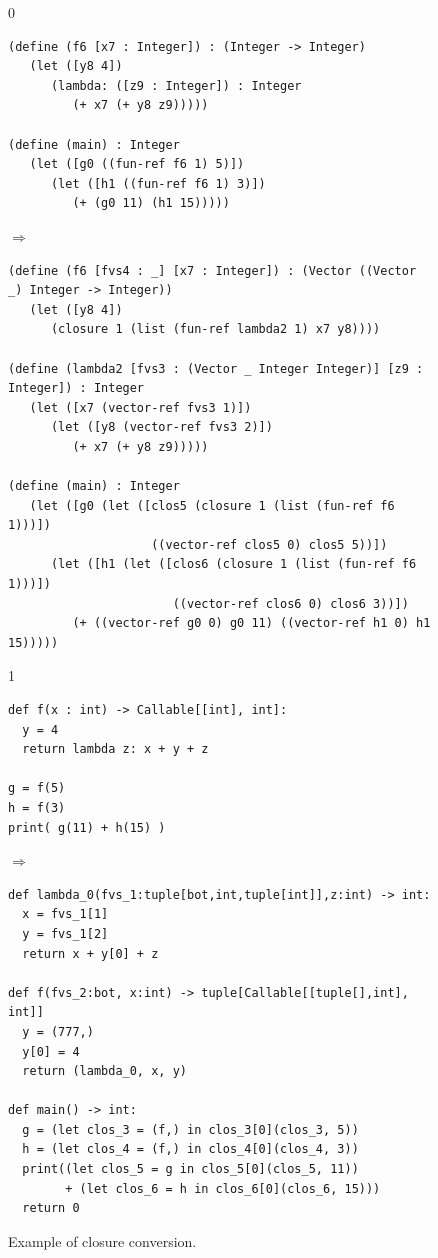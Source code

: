 \documentclass[7x10]{TimesAPriori_MIT}%
\def\racketEd{0}
\def\pythonEd{1}
\def\edition{1}
\newcommand{\pythonColor}[0]{}
\numberwithin{theorem}{chapter}
\numberwithin{definition}{chapter}
\numberwithin{equation}{chapter}
\begin{document}
\begin{figure}[tbp]
  \begin{tcolorbox}[colback=white]
    \begin{minipage}{0.8\textwidth}
{\if\edition\racketEd
\begin{lstlisting}[basicstyle=\ttfamily\footnotesize]
(define (f6 [x7 : Integer]) : (Integer -> Integer)
   (let ([y8 4])
      (lambda: ([z9 : Integer]) : Integer
         (+ x7 (+ y8 z9)))))

(define (main) : Integer
   (let ([g0 ((fun-ref f6 1) 5)])
      (let ([h1 ((fun-ref f6 1) 3)])
         (+ (g0 11) (h1 15)))))
\end{lstlisting}
$\Rightarrow$
\begin{lstlisting}[basicstyle=\ttfamily\footnotesize]
(define (f6 [fvs4 : _] [x7 : Integer]) : (Vector ((Vector _) Integer -> Integer))
   (let ([y8 4])
      (closure 1 (list (fun-ref lambda2 1) x7 y8))))

(define (lambda2 [fvs3 : (Vector _ Integer Integer)] [z9 : Integer]) : Integer
   (let ([x7 (vector-ref fvs3 1)])
      (let ([y8 (vector-ref fvs3 2)])
         (+ x7 (+ y8 z9)))))

(define (main) : Integer
   (let ([g0 (let ([clos5 (closure 1 (list (fun-ref f6 1)))])
                    ((vector-ref clos5 0) clos5 5))])
      (let ([h1 (let ([clos6 (closure 1 (list (fun-ref f6 1)))])
                       ((vector-ref clos6 0) clos6 3))])
         (+ ((vector-ref g0 0) g0 11) ((vector-ref h1 0) h1 15)))))
\end{lstlisting}
\fi}
%
{\if\edition\pythonEd\pythonColor
\begin{lstlisting}
def f(x : int) -> Callable[[int], int]:
  y = 4
  return lambda z: x + y + z

g = f(5)
h = f(3)
print( g(11) + h(15) )
\end{lstlisting}
$\Rightarrow$
\begin{lstlisting}
def lambda_0(fvs_1:tuple[bot,int,tuple[int]],z:int) -> int:
  x = fvs_1[1]
  y = fvs_1[2]
  return x + y[0] + z

def f(fvs_2:bot, x:int) -> tuple[Callable[[tuple[],int], int]]
  y = (777,)
  y[0] = 4
  return (lambda_0, x, y)

def main() -> int:
  g = (let clos_3 = (f,) in clos_3[0](clos_3, 5))
  h = (let clos_4 = (f,) in clos_4[0](clos_4, 3))
  print((let clos_5 = g in clos_5[0](clos_5, 11))
        + (let clos_6 = h in clos_6[0](clos_6, 15)))
  return 0
\end{lstlisting}
\fi}
\end{minipage}
  \end{tcolorbox}

  \caption{Example of closure conversion.}
\label{fig:lexical-functions-example}
\end{figure}
\end{document}
